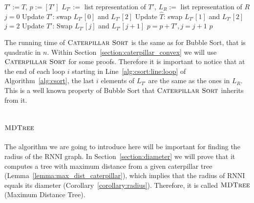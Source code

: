 \documentclass{amsart}
\newcommand{\rnni}{\mathrm{RNNI}}
\newcommand{\csort}{\textsc{Caterpillar Sort}}
\newcommand{\mdtree}{\textsc{MDTree}}
\begin{document}
\begin{algorithm}[H]
\caption{$\csort$($T,R$)}
\label{alg:csort}
\begin{algorithmic}[1]
    \STATE $T':= T$, $p := [T']$
    \STATE $L_{T'}:=$ list representation of $T'$, $L_R:=$ list representation of $R$
     \label{alg:csort:line:loop}
        \STATE $j = 0$ 
            \STATE Update $T'$: swap $L_{T'}[0]$ and $L_{T'}[2]$
            \STATE Update $\hat T$: swap $L_{T'}[1]$ and $L_{T'}[2]$
        \ENDIF
        \STATE $j = 2$
			\STATE Update $T'$: Swap $L_{T'}[j]$ and $L_{T'}[j+1]$
			\STATE $p = p+T', j = j + 1$
		\ENDWHILE
    \ENDFOR
	\RETURN $p$
\end{algorithmic}
\end{algorithm}

The running time of $\csort$ is the same as for Bubble Sort, that is quadratic in $n$.
Within Section~\ref{section:caterpillar_convex} we will use $\csort$ for some proofs.
Therefore it is important to notice that at the end of each loop $i$ starting in Line~\ref{alg:csort:line:loop} of Algorithm~\ref{alg:csort}, the last $i$ elements of $L_{T'}$ are the same as the ones in $L_R$.
This is a well known property of Bubble Sort that $\csort$ inherits from it.


\subsection{$\mdtree$}
\label{section:alg_mdtree}

The algorithm we are going to introduce here will be important for finding the radius of the $\rnni$ graph.
In Section~\ref{section:diameter} we will prove that it computes a tree with maximum distance from a given caterpillar tree (Lemma~\ref{lemma:max_dist_caterpillar}), which implies that the radius of $\rnni$ equals its diameter (Corollary~\ref{corollary:radius}).
Therefore, it is called $\mdtree$ (Maximum Distance Tree).
\end{document}
